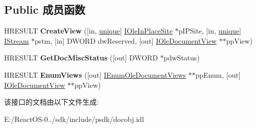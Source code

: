 \subsection*{Public 成员函数}
\begin{DoxyCompactItemize}
\item 
\mbox{\label{interface_i_ole_document_a030f5e641bd434992674acac95624f5b}} 
H\+R\+E\+S\+U\+LT {\bfseries Create\+View} (\mbox{[}in, \hyperlink{interfaceunique}{unique}\mbox{]} \hyperlink{interface_i_ole_in_place_site}{I\+Ole\+In\+Place\+Site} $\ast$p\+I\+P\+Site, \mbox{[}in, \hyperlink{interfaceunique}{unique}\mbox{]} \hyperlink{interface_i_stream}{I\+Stream} $\ast$pstm, \mbox{[}in\mbox{]} D\+W\+O\+RD dw\+Reserved, \mbox{[}out\mbox{]} \hyperlink{interface_i_ole_document_view}{I\+Ole\+Document\+View} $\ast$$\ast$pp\+View)
\item 
\mbox{\label{interface_i_ole_document_ab35cb8f7ac611ccfae9d085ef2a7f136}} 
H\+R\+E\+S\+U\+LT {\bfseries Get\+Doc\+Misc\+Status} (\mbox{[}out\mbox{]} D\+W\+O\+RD $\ast$pdw\+Status)
\item 
\mbox{\label{interface_i_ole_document_a704745dc9889507333c61a27ab4c09cb}} 
H\+R\+E\+S\+U\+LT {\bfseries Enum\+Views} (\mbox{[}out\mbox{]} \hyperlink{interface_i_enum_ole_document_views}{I\+Enum\+Ole\+Document\+Views} $\ast$$\ast$pp\+Enum, \mbox{[}out\mbox{]} \hyperlink{interface_i_ole_document_view}{I\+Ole\+Document\+View} $\ast$$\ast$pp\+View)
\end{DoxyCompactItemize}


该接口的文档由以下文件生成\+:\begin{DoxyCompactItemize}
\item 
E\+:/\+React\+O\+S-\/0../sdk/include/psdk/docobj.\+idl\end{DoxyCompactItemize}
